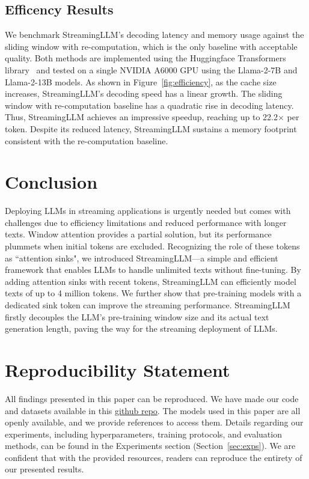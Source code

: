 \subsection{Efficency Results}

We benchmark StreamingLLM's decoding latency and memory usage against the sliding window with re-computation, which is the only baseline with acceptable quality. Both methods are implemented using the Huggingface Transformers library~\citep{wolf2020huggingfaces} and tested on a single NVIDIA A6000 GPU using the Llama-2-7B and Llama-2-13B models. As shown in Figure~\ref{fig:efficiency}, as the cache size increases, StreamingLLM's decoding speed has a linear growth. The sliding window with re-computation baseline has a quadratic rise in decoding latency. Thus, StreamingLLM achieves an impressive speedup, reaching up to 22.2$\times$ per token. Despite its reduced latency, StreamingLLM sustains a memory footprint consistent with the re-computation baseline.

\section{Conclusion}
Deploying LLMs in streaming applications is urgently needed but comes with challenges due to efficiency limitations and reduced performance with longer texts. Window attention provides a partial solution, but its performance plummets when initial tokens are excluded. Recognizing the role of these tokens as ``attention sinks", we introduced StreamingLLM—a simple and efficient framework that enables LLMs to handle unlimited texts without fine-tuning. By adding attention sinks with recent tokens, StreamingLLM can efficiently model texts of up to 4 million tokens. We further show that pre-training models with a dedicated sink token can improve the streaming performance. StreamingLLM firstly decouples the LLM's pre-training window size and its actual text generation length, paving the way for the streaming deployment of LLMs.

\section*{Reproducibility Statement} All findings presented in this paper can be reproduced. We have made our code and datasets available in this \href{https://github.com/mit-han-lab/streaming-llm}{github repo}. The models used in this paper are all openly available, and we provide references to access them. Details regarding our experiments, including hyperparameters, training protocols, and evaluation methods, can be found in the Experiments section (Section~\ref{sec:exps}). We are confident that with the provided resources, readers can reproduce the entirety of our presented results.


